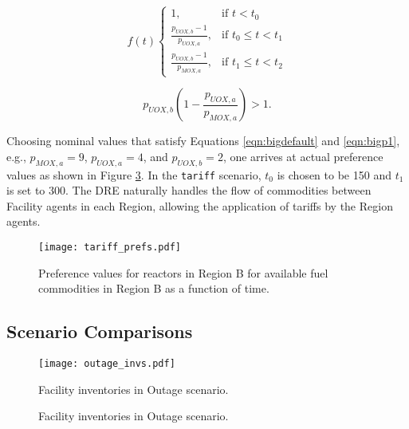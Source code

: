 \begin{equation}\label{eqn:tariff}
f(t)
\begin{cases}
1, & \text{if } t < t_0 \\
\frac{p_{UOX, b} - 1}{p_{UOX, a}}, & \text{if } t_0 \leq t < t_1 \\
\frac{p_{UOX, b} - 1}{p_{MOX, a}}, & \text{if } t_1 \leq t < t_2
\end{cases} 
\end{equation}

\begin{equation}\label{eqn:bigp1}
  p_{UOX, b} \left( 1 - \frac{p_{UOX, a}}{p_{MOX, a}} \right) > 1.
\end{equation}

Choosing nominal values that satisfy Equations \ref{eqn:bigdefault} and
\ref{eqn:bigp1}, e.g., $p_{MOX, a} = 9$, $p_{UOX, a} = 4$, and $p_{UOX, b} = 2$,
one arrives at actual preference values as shown in Figure \ref{fig:prefs}. In
the \texttt{tariff} scenario, $t_0$ is chosen to be 150 and $t_1$ is set to
300. The DRE naturally handles the flow of commodities between Facility agents
in each Region, allowing the application of tariffs by the Region agents.

\begin{figure}
  \begin{center}
    \texttt{[image: tariff\_prefs.pdf]}
    \caption[]{
      \label{fig:prefs}
      Preference values for reactors in Region B for available fuel commodities
      in Region B as a function of time.}
  \end{center}
\end{figure}

\subsection{Scenario Comparisons}


\begin{figure}
  \begin{center}
    \texttt{[image: outage\_invs.pdf]}
    \caption[]{
      \label{fig:prefs}
      Facility inventories in Outage scenario.}
  \end{center}
\end{figure}

\begin{figure}
  \centering
  \begin{minipage}{0.67\textwidth}
    \centering
    \vfill
  \end{minipage}%
  \begin{minipage}{0.33\textwidth}
    \centering
  \end{minipage}%
  \caption[]{
    \label{fig:prefs}
    Facility inventories in Outage scenario.}
\end{figure}

